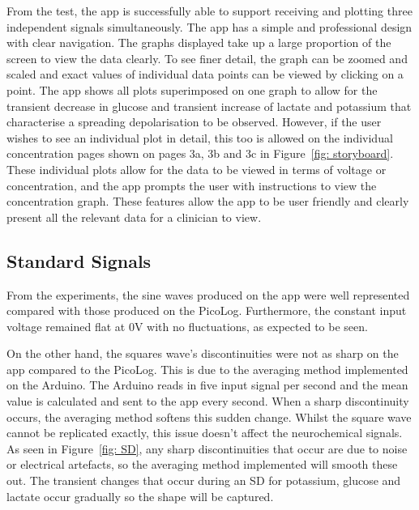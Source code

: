 From the test, the app is successfully able to support receiving and plotting three independent signals simultaneously. The app has a simple and professional design with clear navigation. The graphs displayed take up a large proportion of the screen to view the data clearly. To see finer detail, the graph can be zoomed and scaled and exact values of individual data points can be viewed by clicking on a point. The app shows all plots superimposed on one graph to allow for the transient decrease in glucose and transient increase of lactate and potassium that characterise a spreading depolarisation to be observed. However, if the user wishes to see an individual plot in detail, this too is allowed on the individual concentration pages shown on pages 3a, 3b and 3c in Figure~\ref{fig: storyboard}. These individual plots allow for the data to be viewed in terms of voltage or concentration, and the app prompts the user with instructions to view the concentration graph. These features allow the app to be user friendly and clearly present all the relevant data for a clinician to view.





\subsection{Standard Signals}

From the experiments, the sine waves produced on the app were well represented compared with those produced on the PicoLog. Furthermore, the constant input voltage remained flat at 0V with no fluctuations, as expected to be seen.

On the other hand, the squares wave's discontinuities were not as sharp on the app compared to the PicoLog. This is due to the averaging method implemented on the Arduino. The Arduino reads in five input signal per second and the mean value is calculated and sent to the app every second. When a sharp discontinuity occurs, the averaging method softens this sudden change. Whilst the square wave cannot be replicated exactly, this issue doesn't affect the neurochemical signals. As seen in Figure~\ref{fig: SD}, any sharp discontinuities that occur are due to noise or electrical artefacts, so the averaging method implemented will smooth these out. The transient changes that occur during an SD for potassium, glucose and lactate occur gradually so the shape will be captured.

